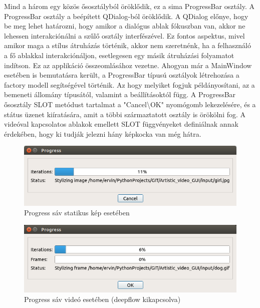 \documentclass[12pt, a4paper, oneside]{book}
\theoremstyle{tetel}
\begin{document}
Mind a három egy közös ősosztályból öröklődik, ez a sima ProgressBar osztály. A ProgressBar osztály a beépített QDialog-ból öröklődik. A QDialog előnye, hogy be meg lehet határozni, hogy amikor a dialógus ablak fókuszban van, akkor ne lehessen interakciónálni a szűlő osztály interfészével. Ez fontos aspektus, mivel amikor maga a stílus átruházás történik, akkor nem szeretnénk, ha a felhasználó a fő ablakkal interakciónáljon, esetlegesen egy másik átruházási folyamatot indítson. Ez az applikáció összeomlásához vezetne.
\newline
\indent
Ahogyan már a MainWindow esetében is bemutatásra került, a ProgressBar típusú osztályok létrehozása a factory modell segítségével történik. Az hogy melyiket fogjuk példányosítani, az a bemeneti állomány típusától, valamint a beállításoktól függ. A ProgressBar ősosztály SLOT metódust tartalmat a "Cancel\textbackslash OK" nyomógomb lekezelésére, és a státus üzenet kiíratására, amit a többi származtatott osztály is örökölni fog. 
A videóval kapcsolatos ablakok emellett SLOT függvényeket definiálnak annak érdekében, hogy ki tudják jelezni hány képkocka van még hátra.

\begin{figure}[!htbp]
	\begin{center}
		\includegraphics[scale=0.5]{progressbar_image.png}
		\caption{Progress sáv statikus kép esetében}
		\label{progressbar_image_ui}
	\end{center}
\end{figure}

\begin{figure}[!htbp]
	\begin{center}
		\includegraphics[scale=0.5]{progressbar_video_no_deepflow.png}
		\caption{Progress sáv videó esetében (deepflow kikapcsolva)}
		\label{progressbar_video_no_deeplfow_ui}
	\end{center}
\end{figure}
\end{document}
